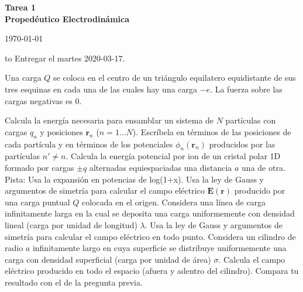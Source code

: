 \documentclass{exam}
\begin{document}
\begin{center}
\bf\large Tarea 1\\
Propedéutico Electrodinámica\\
\date{2020-03-10}
\today\\[20pt]
\end{center}
\hbox to \textwidth{Nombre: \enspace\hrulefill}
Entregar el martes 2020-03-17.

\begin{questions}
  \question Una carga $Q$ se coloca en el centro de un triángulo
  equilatero equidistante de sus tres esquinas en cada una de las
  cuales hay una carga $-e$. La
  fuerza sobre las cargas negativas es 0.
  \question Calcula la energía necesaria para ensamblar un sistema de
  $N$ partículas con cargas $q_n$ y posiciones $\bm r_n$
  ($n=1\ldots N$). Escríbela en términos de las posiciones de cada
  partícula y en términos de los potenciales $\phi_n(\bm r_n)$
  producidos por las partículas $n'\ne n$.
  \question Calcula la energía potencial por ion de un cristal polar 1D
  formado por cargas $\pm q$ alternadas equiespaciadas una distancia $a$
  una de otra.\\Pista: Usa la expansión en potencias de log(1+x).
  \question Usa la ley de Gauss y argumentos de simetría para calcular
  el campo eléctrico $\bm E(\bm r)$ producido por una carga puntual
  $Q$ colocada en el origen.
  \question Considera una línea de carga infinitamente larga en la
  cual se deposita una carga uniformemente con densidad lineal (carga
  por unidad de longitud) $\lambda$.
  Usa la ley de Gauss y argumentos de simetría para calcular el campo
  eléctrico en todo punto.
  \question Considera un cilindro de radio $a$ infinitamente largo en
  cuya superficie se distribuye uniformemente una carga con densidad
  superficial (carga por unidad de área) $\sigma$. Calcula el campo
  eléctrico producido en todo el espacio (afuera y adentro del
  cilindro). Compara tu resultado con el de la pregunta previa.
  \question
\end{questions}
\end{document}
